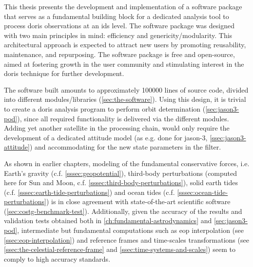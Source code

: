 \iffalse
Within the framework of this Thesis, a software package was designed and implemented from scratch, 
with the aim of acting as a fundamental building block for a state-of-the-art, \gls{ids} 
level, dedicated analysis tool for processing \gls{doris} observations. The design 
principle adopted was twofold, based on efficiency on the one hand and on the same time 
allowing for genericity and modularity. This architectural approach will hopefully 
attract new users, since it favors reusability, maintenance and repurposing. The software 
package is free and open-source, a policy adopted to further aid the growth of the 
user community and in turn boost interest in the technique and thus accommodate further 
developments.
\fi
This thesis presents the development and implementation of a software package 
that serves as a fundamental building block for a dedicated analysis tool to 
process \gls{doris} observations at an \gls{ids} level. The software package 
was designed with two main principles in mind: efficiency and genericity/modularity. 
This architectural approach is expected to attract new users by promoting 
reusability, maintenance, and repurposing. The software package is free and open-source, 
aimed at fostering growth in the user community and stimulating interest in the 
\gls{doris} technique for further development.

The software built amounts to approximately 100000 lines of source code, divided into 
different modules/libraries (\autoref{sec:the-software}). Using this design, it is 
trivial to create a \gls{doris} analysis program to perform orbit determination 
(\autoref{sec:jason3-pod}), since all required functionality is delivered via the 
different modules. Adding yet another satellite in the processing chain, would only 
require the development of a dedicated attitude model (as e.g. done for \gls{jason}-3, \autoref{ssec:jason3-attitude}) 
and accommodating for the new state parameters in the filter.

As shown in earlier chapters, modeling of the fundamental conservative forces, i.e.
Earth's gravity (c.f. \autoref{sssec:geopotential}), third-body perturbations (computed
here for Sun and Moon, c.f. \autoref{sssec:third-body-perturbations}), solid earth tides
(c.f. \autoref{sssec:earth-tide-perturbations}) and ocean tides (c.f.
\autoref{sssec:ocean-tide-perturbations}) is in close agreement with state-of-the-art
scientific software (\autoref{sec:costg-benchmark-test}). Additionally, given the
accuracy of the results and validation tests obtained both in \autoref{ch:fundamental-astrodynamics}
and \autoref{sec:jason3-pod}, intermediate but fundamental computations such as
\gls{eop} interpolation (see \autoref{ssec:eop-interpolation}) and reference frames and
time-scales transformations (see \autoref{ssec:the-celestial-reference-frame} and
\autoref{ssec:time-systems-and-scales}) seem to comply to high accuracy standards.

